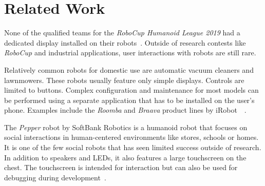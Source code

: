 \chapter{Related Work}
\label{related-work}

None of the qualified teams for the \textit{RoboCup Humanoid League 2019} had a dedicated display
installed on their robots~\cite{robocup-humanoid-teams}. Outside of research contests like
\textit{RoboCup} and industrial applications, user interactions with robots are still rare.
\bigbreak

Relatively common robots for domestic use are automatic vacuum cleaners and lawnmowers. These robots
usually feature only simple displays. Controls are limited to buttons. Complex configuration and
maintenance for most models can be performed using a separate application that has to be installed on
the user's phone. Examples include the \textit{Roomba} and \textit{Braava} product lines by iRobot~\
\cite{irobot-website}.

The \textit{Pepper} robot by SoftBank Robotics is a humanoid robot that focuses on social interactions
in human-centered environments like stores, schools or homes. It is one of the few social robots that
has seen limited success outside of research. In addition to speakers and LEDs, it also features a
large touchscreen on the chest. The touchscreen is intended for interaction but can also be used for
debugging during development~\cite{pepper-robot}.

